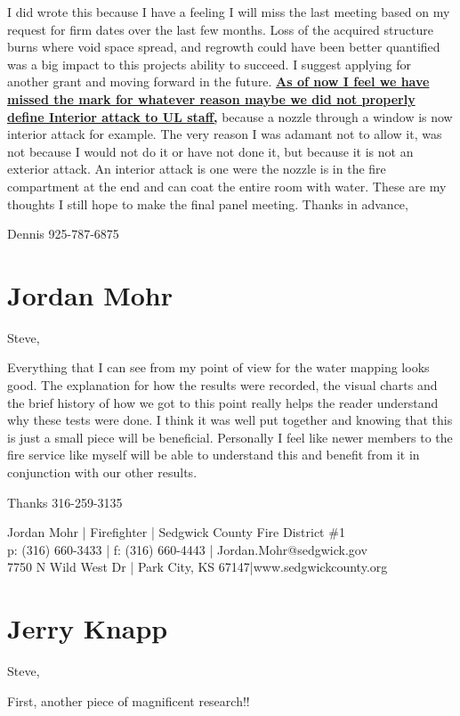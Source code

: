 \documentclass[12pt,oneside]{book}
\begin{document}
\begin{appendix}
I did wrote this because I have a feeling I will miss the last meeting based on my request for firm dates over the last few months.  Loss of the acquired structure burns where void space spread, and regrowth could have been better quantified was a big impact to this projects ability to succeed.  I suggest applying for another grant and moving forward in the future.  \textbf{\ul{As of now I feel we have missed the mark for whatever reason maybe we did not properly define Interior attack to UL staff,}} because a nozzle through a window is now interior attack for example.  The very reason I was adamant not to allow it, was not because I would not do it or have not done it, but because it is not an exterior attack.  An interior attack is one were the nozzle is in the fire compartment at the end and can coat the entire room with water.  These are my thoughts I still hope to make the final panel meeting.  
Thanks in advance,

Dennis 925-787-6875

\section{Jordan Mohr}

Steve,
 
Everything that I can see from my point of view for the water mapping looks good. The explanation for how the results were recorded, the visual charts and the brief history of how we got to this point really helps the reader understand why these tests were done. I think it was well put together and knowing that this is just a small piece will be beneficial. Personally I feel like newer members to the fire service like myself will be able to understand this and benefit from it in conjunction with our other results.
 
Thanks
316-259-3135
 
Jordan Mohr | Firefighter | Sedgwick County Fire District \#1 \\
p: (316) 660-3433 | f: (316) 660-4443 | Jordan.Mohr@sedgwick.gov \\
7750 N Wild West Dr | Park City, KS 67147|www.sedgwickcounty.org \\

\section{Jerry Knapp}

Steve,
 
First, another piece of magnificent research!!  
 

\end{appendix}
\end{document}
